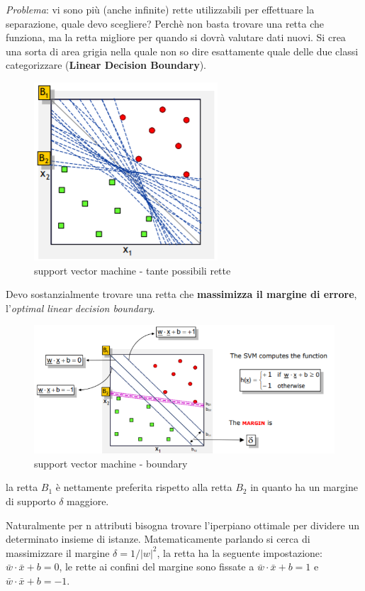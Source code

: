 \textit{Problema}: vi sono pi\`u (anche infinite) rette utilizzabili per effettuare la separazione, quale devo scegliere? Perch\`e non basta trovare una retta che funziona, ma la retta migliore per quando si dovr\`a valutare dati nuovi. Si crea una sorta di area grigia nella quale non so dire esattamente quale delle due classi categorizzare (\textbf{Linear Decision Boundary}).

\begin{figure}[H]
	\centering
	\includegraphics[height=0.4 \linewidth]{classification/pict/svm_rette.png}
	\caption{support vector machine - tante possibili rette}
\end{figure}

Devo sostanzialmente trovare una retta che \textbf{massimizza il margine di errore}, l'\textit{optimal linear decision boundary}. 

\begin{figure}[H]
	\hspace{-0.5cm}
	\includegraphics[height=0.45 \linewidth]{classification/pict/svm_boundary.png}
	\caption{support vector machine - boundary}
\end{figure}

la retta $B_1$ è nettamente preferita rispetto alla retta $B_2$ in quanto ha un margine di supporto $\delta$ maggiore. 

Naturalmente per n attributi bisogna trovare l'iperpiano ottimale per dividere un determinato insieme di istanze. Matematicamente parlando si cerca di massimizzare il margine $\delta = 1 / |w|^2$, la retta ha la seguente impostazione: $\bar{w} \cdot \bar{x} + b = 0$, le rette ai confini del margine sono fissate a $\bar{w} \cdot \bar{x} + b = 1$ e $\bar{w} \cdot \bar{x} + b = -1$. 


